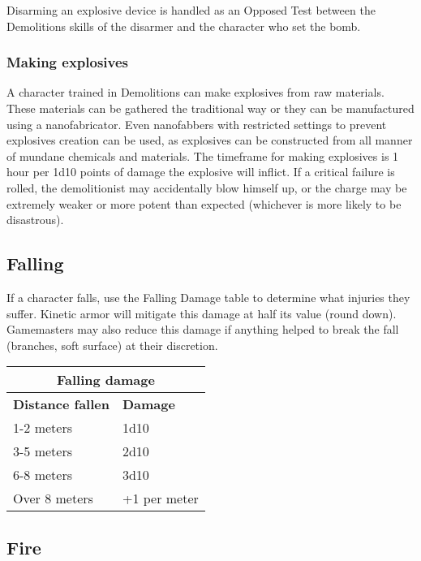 Disarming an explosive device is handled as an Opposed Test between the Demolitions skills of the disarmer and the character who set the bomb.


\subsubsection{Making explosives}

A character trained in Demolitions can make explosives from raw materials. These materials can be gathered the traditional way or they can be manufactured using a nanofabricator. Even nanofabbers with restricted settings to prevent explosives creation can be used, as explosives can be constructed from all manner of mundane chemicals and materials. The timeframe for making explosives is 1 hour per 1d10 points of damage the explosive will inflict. If a critical failure is rolled, the demolitionist may accidentally blow himself up, or the charge may be extremely weaker or more potent than expected (whichever is more likely to be disastrous).


\subsection{Falling}
\label{sec:falling}

If a character falls, use the Falling Damage table to determine what injuries they suffer. Kinetic armor will mitigate this damage at half its value (round down). Gamemasters may also reduce this damage if anything helped to break the fall (branches, soft surface) at their discretion.

\begin{table}
\begin{tabular}{|l|l|}
\hline
\multicolumn{2}{|c|}{\textbf{Falling damage}}	\\
\hline
\textbf{Distance fallen}		& \textbf{Damage}	\\
\hline
1-2 meters				& 1d10			\\
\hline
3-5 meters				& 2d10			\\
\hline
6-8 meters				& 3d10			\\
\hline
Over 8 meters				& +1 per meter		\\
\hline
\end{tabular}
\label{tab:falling-damage}
\end{table}


\subsection{Fire}
\label{sec:fire}

